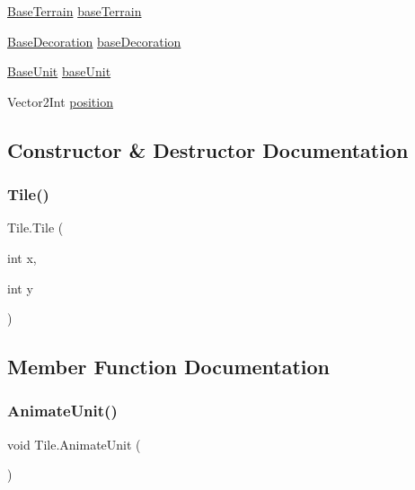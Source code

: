 \begin{DoxyCompactItemize}
\item 
\mbox{\hyperlink{class_base_terrain}{Base\+Terrain}} \mbox{\hyperlink{class_tile_a36dba2c580e50ce450df4a0b58d69130}{base\+Terrain}}
\item 
\mbox{\hyperlink{class_base_decoration}{Base\+Decoration}} \mbox{\hyperlink{class_tile_a73a26ee1d73d9418cf55d4a8ec585910}{base\+Decoration}}
\item 
\mbox{\hyperlink{class_base_unit}{Base\+Unit}} \mbox{\hyperlink{class_tile_a2d5020851ac36840a83e8933da9c2b1e}{base\+Unit}}
\item 
Vector2\+Int \mbox{\hyperlink{class_tile_aa4046f981671278e33441b6f001b3e9e}{position}}
\end{DoxyCompactItemize}


\subsection{Constructor \& Destructor Documentation}
\mbox{\label{class_tile_ac4b178062ea8879968150b8a79830267}} 
\subsubsection{\texorpdfstring{Tile()}{Tile()}}
{\footnotesize\ttfamily Tile.\+Tile (\begin{DoxyParamCaption}\item[{int}]{x,  }\item[{int}]{y }\end{DoxyParamCaption})}



\subsection{Member Function Documentation}
\mbox{\label{class_tile_a87c523416006468a2791d61bf3be54ca}} 
\subsubsection{\texorpdfstring{AnimateUnit()}{AnimateUnit()}}
{\footnotesize\ttfamily void Tile.\+Animate\+Unit (\begin{DoxyParamCaption}{ }\end{DoxyParamCaption})}

